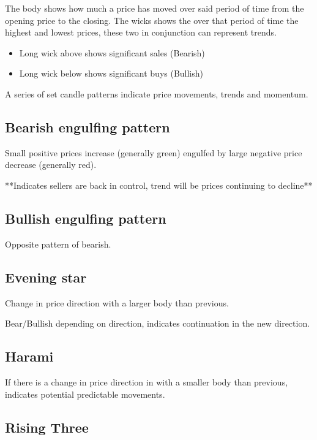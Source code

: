 \documentclass[11pt]{scrartcl} %
\begin{document}
The body shows how much a price has moved over said period of time from the opening price to the 
closing. The wicks shows the over that period of time the highest and lowest prices, 
these two in conjunction can represent trends.

\begin{itemize}
	\item Long wick above shows significant sales (Bearish)
	\item Long wick below shows significant buys (Bullish)
\end{itemize}

A series of set candle patterns indicate price movements, trends and momentum.

\subsection{Bearish engulfing pattern}

Small positive prices increase (generally green) engulfed by large negative price decrease 
(generally red). 

**Indicates sellers are back in control, trend will be prices continuing to decline**

\subsection{Bullish engulfing pattern}

Opposite pattern of bearish.

\subsection{Evening star} 

Change in price direction with a larger body than previous.

Bear/Bullish depending on direction, indicates continuation in the new direction.

\subsection{Harami}

If there is a change in price direction in with a smaller body than previous, indicates potential 
predictable movements.

\subsection{Rising Three}
\end{document}
